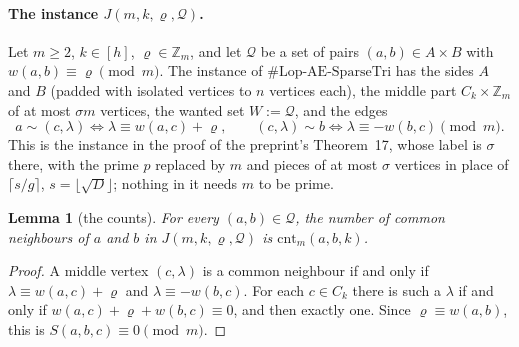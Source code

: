 \documentclass[11pt]{article}
\newtheorem{lemma}[theorem]{Lemma}
\theoremstyle{definition}
\theoremstyle{remark}
\newcommand{\Z}{\mathbb{Z}}
\newcommand{\Lop}{\mathrm{Lop}\text{-}\allowbreak\mathrm{AE}\text{-}\allowbreak\mathrm{SparseTri}}
\newcommand{\cnt}{\mathrm{cnt}}
\begin{document}
\paragraph{The instance $J(m,k,\varrho,\mathcal Q)$.} Let $m\ge2$, $k\in[h]$, $\varrho\in\Z_m$, and let $\mathcal Q$ be a set of pairs $(a,b)\in A\times B$ with $w(a,b)\equiv\varrho\pmod m$. The instance of $\#\Lop$ has the sides $A$ and $B$ (padded with isolated vertices to $n$ vertices each), the middle part $C_k\times\Z_m$ of at most $\sigma m$ vertices, the wanted set $W:=\mathcal Q$, and the edges
\[
a\sim(c,\lambda)\iff\lambda\equiv w(a,c)+\varrho,\qquad (c,\lambda)\sim b\iff\lambda\equiv-w(b,c)\pmod m .
\]
This is the instance in the proof of the preprint's Theorem~17, whose label is $\sigma$ there, with the prime $p$ replaced by $m$ and pieces of at most $\sigma$ vertices in place of $\lceil s/g\rceil$, $s=\lfloor\sqrt D\rfloor$; nothing in it needs $m$ to be prime.

\begin{lemma}[the counts]\label{e:lem:counts}
For every $(a,b)\in\mathcal Q$, the number of common neighbours of $a$ and $b$ in $J(m,k,\varrho,\mathcal Q)$ is $\cnt_m(a,b,k)$.
\end{lemma}
\begin{proof}
A middle vertex $(c,\lambda)$ is a common neighbour if and only if $\lambda\equiv w(a,c)+\varrho$ and $\lambda\equiv-w(b,c)$. For each $c\in C_k$ there is such a $\lambda$ if and only if $w(a,c)+\varrho+w(b,c)\equiv0$, and then exactly one. Since $\varrho\equiv w(a,b)$, this is $S(a,b,c)\equiv0\pmod m$.
\end{proof}
\end{document}
